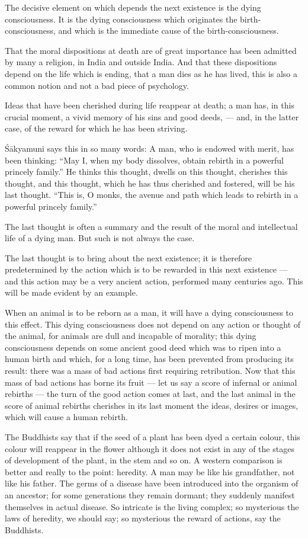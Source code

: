 \documentclass[a4paper, 11pt, oneside, english]{article}
\begin{document}
The decisive element on which depends the next existence is the dying consciousness. It is the dying consciousness which originates the birth-consciousness, and which is the immediate cause of the birth-consciousness.

That the moral dispositions at death are of great importance has been admitted by many a religion, in India and outside India. And that these dispositions depend on the life which is ending, that a man dies as he has lived, this is also a common notion and not a bad piece of psychology.

Ideas that have been cherished during life reappear at death; a man has, in this crucial moment, a vivid memory of his sins and good deeds, --- and, in the latter case, of the reward for which he has been striving.

Śākyamuni says this in so many words: A man, who is endowed with merit, has been thinking: ``May I, when my body dissolves, obtain rebirth in a powerful princely family.'' He thinks this thought, dwells on this thought, cherishes this thought, and this thought, which he has thus cherished and fostered, will be his last thought. ``This is, O monks, the avenue and path which leads to rebirth in a powerful princely family.''

The last thought is often a summary and the result of the moral and intellectual life of a dying man. But such is not always the case.

The last thought is to bring about the next existence; it is therefore predetermined by the action which is to be rewarded in this next existence --- and this action may be a very ancient action, performed many centuries ago. This will be made evident by an example.

When an animal is to be reborn as a man, it will have a dying consciousness to this effect. This dying consciousness does not depend on any action or thought of the animal, for animals are dull and incapable of morality; this dying consciousness depends on some ancient good deed which was to ripen into a human birth and which, for a long time, has been prevented from producing its result: there was a mass of bad actions first requiring retribution. Now that this mass of bad actions has borne its fruit --- let us say a score of infernal or animal rebirths --- the turn of the good action comes at last, and the last animal in the score of animal rebirths cherishes in its last moment the ideas, desires or images, which will cause a human rebirth.

The Buddhists say that if the seed of a plant has been dyed a certain colour, this colour will reappear in the flower although it does not exist in any of the stages of development of the plant, in the stem and so on. A western comparison is better and really to the point: heredity. A man may be like his grandfather, not like his father. The germs of a disease have been introduced into the organism of an ancestor; for some generations they remain dormant; they suddenly manifest themselves in actual disease. So intricate is the living complex; so mysterious the laws of heredity, we should say; so mysterious the reward of actions, say the Buddhists.
\end{document}
